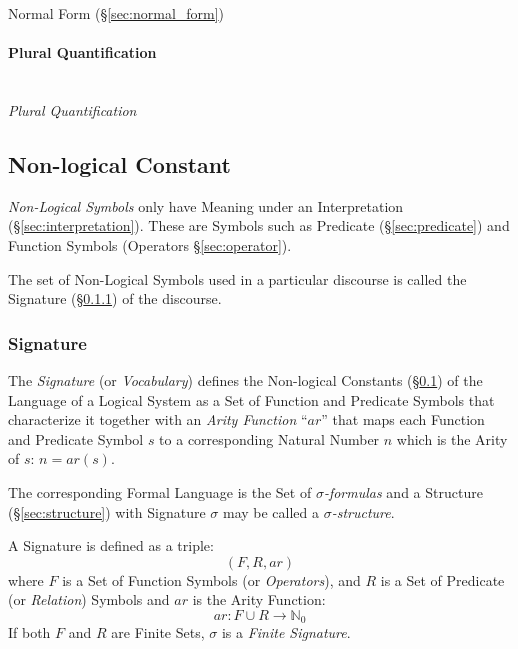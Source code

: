 Normal Form (\S\ref{sec:normal_form})



\paragraph{Plural Quantification}\label{sec:plural_quantification}\hfill \\

\emph{Plural Quantification}



\subsection{Non-logical Constant}\label{sec:nonlogical_constant}

\emph{Non-Logical Symbols} only have Meaning under an Interpretation
(\S\ref{sec:interpretation}). These are Symbols such as Predicate
(\S\ref{sec:predicate}) and Function Symbols (Operators
\S\ref{sec:operator}).

The set of Non-Logical Symbols used in a particular discourse is
called the Signature (\S\ref{sec:signature}) of the discourse.



\subsubsection{Signature}\label{sec:signature}

The \emph{Signature} (or \emph{Vocabulary}) defines the Non-logical
Constants (\S\ref{sec:nonlogical_constant}) of the Language of a
Logical System as a Set of Function and Predicate Symbols that
characterize it together with an \emph{Arity Function} ``$ar$'' that
maps each Function and Predicate Symbol $s$ to a corresponding Natural
Number $n$ which is the Arity of $s$: $n = ar(s)$.

The corresponding Formal Language is the Set of
\emph{$\sigma$-formulas} and a Structure (\S\ref{sec:structure}) with
Signature $\sigma$ may be called a \emph{$\sigma$-structure}.

A Signature is defined as a triple:
\[
  (F,R,ar)
\]
where $F$ is a Set of Function Symbols (or \emph{Operators}), and $R$
is a Set of Predicate (or \emph{Relation}) Symbols and $ar$ is the
Arity Function:
\[
  ar: F \cup R \rightarrow \mathbb{N}_0
\]
If both $F$ and $R$ are Finite Sets, $\sigma$ is a \emph{Finite
  Signature}.


